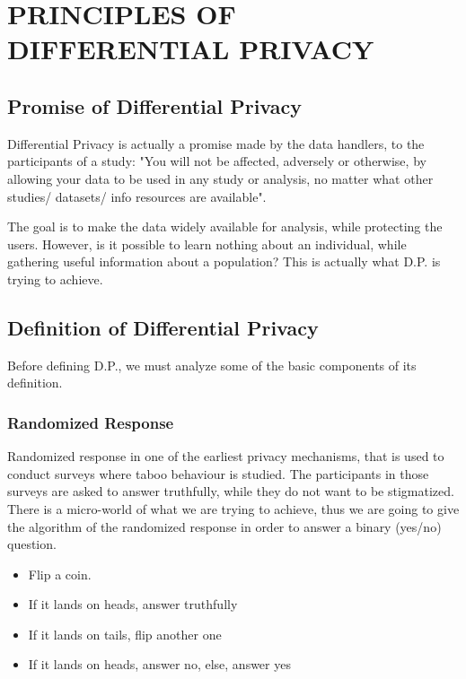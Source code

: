 \chapter{PRINCIPLES OF DIFFERENTIAL PRIVACY}

\section{Promise of Differential Privacy}

\par Differential Privacy is actually a promise made by the data handlers, to the participants of a study: "You will not be affected, adversely or otherwise, by allowing your data to be used in any study or analysis, no matter what other studies/ datasets/ info resources are available". 
\par The goal is to make the data widely available for analysis, while protecting the users. However, is it possible to learn nothing about an individual, while gathering useful information about a population? This is actually what D.P. is trying to achieve.


\section{Definition of Differential Privacy}
Before defining D.P., we must analyze some of the basic components of its definition.

\subsection{Randomized Response}
Randomized response in one of the earliest privacy mechanisms, that is used to conduct surveys where taboo behaviour is studied. The participants in those surveys are asked to answer truthfully, while they do not want to be stigmatized. There is a micro-world of what we are trying to achieve, thus we are going to give the algorithm of the randomized response in order to answer a binary (yes/no) question.

\begin{itemize}
    \item Flip a coin.
    \item If it lands on heads, answer truthfully
    \item If it lands on tails, flip another one
    \item If it lands on heads, answer no, else, answer yes
\end{itemize}

